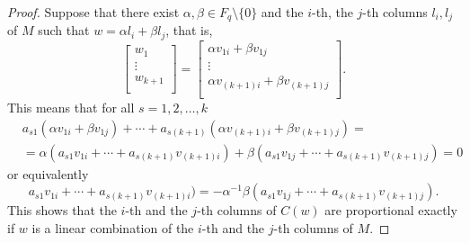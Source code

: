 \documentclass[12pt]{article}
\theoremstyle{definition}
\begin{document}
\begin{proof}
\noindent
Suppose that there exist $\alpha, \beta\in F_q\setminus\{0\}$ and the $i$-th, the  $j$-th columns $l_i, l_j$ of $M$ such that $w=\alpha l_i+\beta l_j$, that is,  $$\left[
\begin{array}{cccc}
w_1\\
\vdots\\
w_{k+1}\\
\end{array}
\right]=\left[
\begin{array}{cccc}
\alpha v_{1i}+\beta v_{1j}\\
\vdots\\
\alpha v_{(k+1)i}+\beta v_{(k+1)j}\\
\end{array}
\right].$$
This means that for all $s=1,2, \dots, k$
\begin{align*}
&a_{s1}(\alpha v_{1i}+\beta v_{1j})+ \cdots +a_{s(k+1)}(\alpha v_{(k+1)i}+\beta v_{(k+1)j})=\\
&=\alpha( a_{s1}v_{1i}+\cdots+ a_{s(k+1)}v_{(k+1)i})        +     \beta (a_{s1}v_{1j}+ \cdots +a_{s(k+1)}v_{(k+1)j})=
0\end{align*}
or equivalently $$a_{s1}v_{1i}+\cdots+ a_{s(k+1)}v_{(k+1)i})=-\alpha^{-1}\beta(a_{s1}v_{1j}+ \cdots +a_{s(k+1)}v_{(k+1)j}).$$
This shows that the $i$-th and the  $j$-th columns of $C(w)$ are proportional exactly if $w$ is a linear combination of the $i$-th and the  $j$-th columns of $M$.
 \end{proof}
\end{document}
